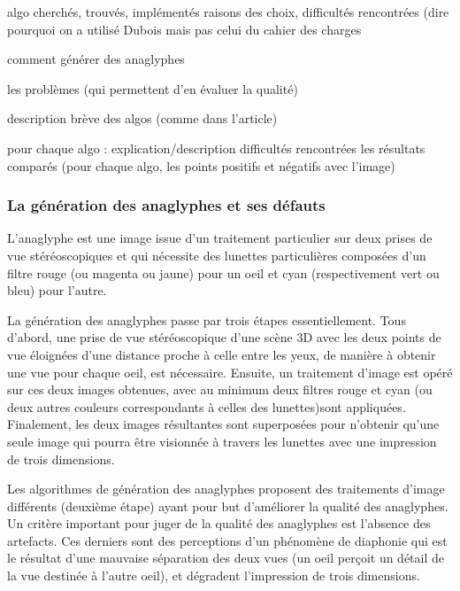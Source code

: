 algo cherchés, trouvés, implémentés
  raisons des choix, difficultés rencontrées
  (dire pourquoi on a utilisé Dubois mais pas celui du cahier des charges


comment générer des anaglyphes 

les problèmes (qui permettent d'en évaluer la qualité)

description brève des algos (comme dans l'article)

pour chaque algo : 
	explication/description
	difficultés rencontrées
 	les résultats comparés (pour chaque algo, les points positifs et négatifs avec l'image)

\subsubsection{La génération des anaglyphes et ses défauts}
	L'anaglyphe est une image issue d'un traitement particulier sur deux prises de vue stéréoscopiques et qui nécessite des lunettes particulières composées d'un filtre rouge (ou magenta ou jaune) pour un oeil et cyan (respectivement vert ou bleu) pour l'autre. 
	
	La génération des anaglyphes passe par trois étapes essentiellement. Tous d'abord, une prise de vue stéréoscopique d'une scène 3D avec les deux points de vue éloignées d'une distance proche à celle entre les yeux, de manière à obtenir une vue pour chaque oeil, est nécessaire. Ensuite, un traitement d'image est opéré sur ces deux images obtenues, avec au minimum deux filtres rouge et cyan (ou deux autres couleurs correspondants à celles des lunettes)sont appliquées. Finalement, les deux images résultantes sont superposées pour n'obtenir qu'une seule image qui pourra être visionnée à travers les lunettes avec une impression de trois dimensions.

	
	Les algorithmes de génération des anaglyphes proposent des traitements d'image différents (deuxième étape) ayant pour but d'améliorer la qualité des anaglyphes. Un critère important pour juger de la qualité des anaglyphes est l'absence des artefacts. Ces derniers sont des perceptions d'un phénomène de diaphonie qui est le résultat d'une mauvaise séparation des deux vues (un oeil perçoit un détail de la vue destinée à l'autre oeil), et dégradent l'impression de trois dimensions. %

